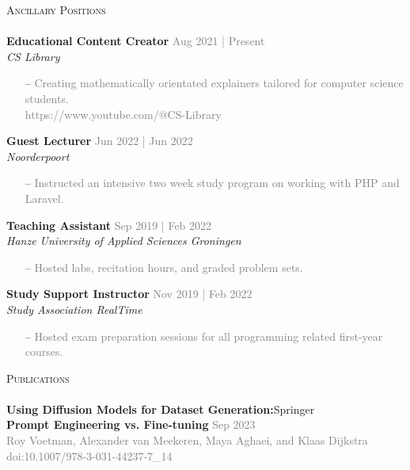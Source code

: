 \documentclass[a4paper]{article}
\newcommand{\lineunder} {
    \vspace*{-8pt} \\
    \hspace*{-18pt} \hrulefill \\
}
\newcommand{\header} [1] {
    {\hspace*{-18pt}\vspace*{6pt} \textsc{#1}}
    \vspace*{-6pt} \lineunder
}
\begin{document}
\vspace{5mm}

\header{Ancillary Positions}
\vspace{1mm}
\textbf{Educational Content Creator} \hfill \textcolor{gray}{Aug 2021 | Present}\\
\textit{CS Library}\\
\vspace{-2mm}
\begin{itemize} \itemsep 1pt
	\item[--] \textcolor{gray}{Creating mathematically orientated explainers tailored for computer science students.}\\
		\textcolor{gray}{https://www.youtube.com/@CS-Library}
\end{itemize}
\textbf{Guest Lecturer} \hfill \textcolor{gray}{Jun 2022 | Jun 2022}\\
\textit{Noorderpoort}\\
\vspace{-2mm}
\begin{itemize} \itemsep 1pt
	\item[--] \textcolor{gray}{Instructed an intensive two week study program on working with PHP and Laravel.}
\end{itemize}
\textbf{Teaching Assistant} \hfill \textcolor{gray}{Sep 2019 | Feb 2022}\\
\textit{Hanze University of Applied Sciences Groningen}\\
\vspace{-2mm}
\begin{itemize} \itemsep 1pt
	\item[--] \textcolor{gray}{Hosted labs, recitation hours, and graded problem sets.}
\end{itemize}
\textbf{Study Support Instructor} \hfill \textcolor{gray}{Nov 2019 | Feb 2022}\\
\textit{Study Association RealTime}\\
\vspace{-2mm}
\begin{itemize} \itemsep 1pt
	\item[--] \textcolor{gray}{Hosted exam preparation sessions for all programming related first-year courses.}
\end{itemize}

\vspace{5mm}

\header{Publications}


\textbf{Using Diffusion Models for Dataset Generation:}\hfill Springer\\
\small{\textbf{Prompt Engineering vs. Fine-tuning} \hfill \textcolor{gray}{Sep 2023}}\\
\footnotesize{\textcolor{gray}{Roy Voetman, Alexander van Meekeren, Maya Aghaei, and Klaas Dijkstra} \hfill
\textcolor{gray}{doi:10.1007/978-3-031-44237-7\_14}}\\
\normalsize
\vspace{2mm}
\end{document}
